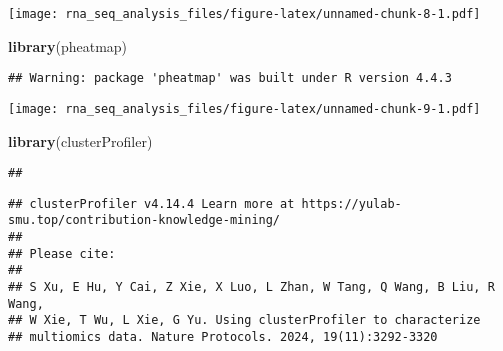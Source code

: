 \documentclass[
]{article}
\newenvironment{Shaded}{\begin{snugshade}}{\end{snugshade}}
\newcommand{\AttributeTok}[1]{\textcolor[rgb]{0.13,0.29,0.53}{#1}}
\newcommand{\CommentTok}[1]{\textcolor[rgb]{0.56,0.35,0.01}{\textit{#1}}}
\newcommand{\ConstantTok}[1]{\textcolor[rgb]{0.56,0.35,0.01}{#1}}
\newcommand{\DecValTok}[1]{\textcolor[rgb]{0.00,0.00,0.81}{#1}}
\newcommand{\FunctionTok}[1]{\textcolor[rgb]{0.13,0.29,0.53}{\textbf{#1}}}
\newcommand{\NormalTok}[1]{#1}
\newcommand{\OtherTok}[1]{\textcolor[rgb]{0.56,0.35,0.01}{#1}}
\newcommand{\SpecialCharTok}[1]{\textcolor[rgb]{0.81,0.36,0.00}{\textbf{#1}}}
\newcommand{\StringTok}[1]{\textcolor[rgb]{0.31,0.60,0.02}{#1}}
\begin{document}
\texttt{[image: rna\_seq\_analysis\_files/figure-latex/unnamed-chunk-8-1.pdf]}

\begin{Shaded}
\begin{Highlighting}[]
\FunctionTok{library}\NormalTok{(pheatmap)}
\end{Highlighting}
\end{Shaded}

\begin{verbatim}
## Warning: package 'pheatmap' was built under R version 4.4.3
\end{verbatim}

\begin{Shaded}
\end{Shaded}

\texttt{[image: rna\_seq\_analysis\_files/figure-latex/unnamed-chunk-9-1.pdf]}

\begin{Shaded}
\begin{Highlighting}[]
\FunctionTok{library}\NormalTok{(clusterProfiler)}
\end{Highlighting}
\end{Shaded}

\begin{verbatim}
## 
\end{verbatim}

\begin{verbatim}
## clusterProfiler v4.14.4 Learn more at https://yulab-smu.top/contribution-knowledge-mining/
## 
## Please cite:
## 
## S Xu, E Hu, Y Cai, Z Xie, X Luo, L Zhan, W Tang, Q Wang, B Liu, R Wang,
## W Xie, T Wu, L Xie, G Yu. Using clusterProfiler to characterize
## multiomics data. Nature Protocols. 2024, 19(11):3292-3320
\end{verbatim}
\end{document}
